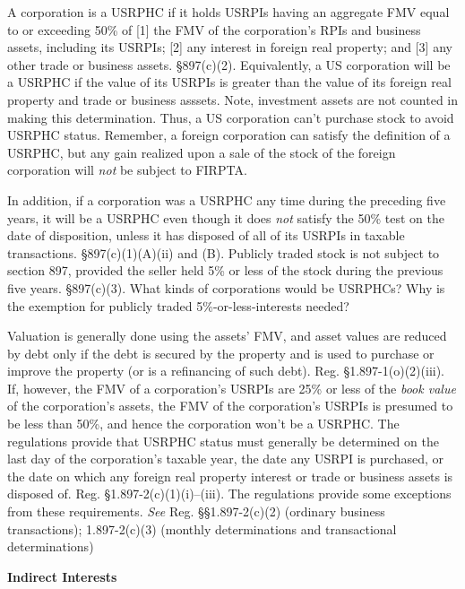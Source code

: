 A corporation is a USRPHC if it holds USRPIs having an aggregate FMV equal to or exceeding 50\% of [1] the FMV of the corporation's RPIs and business assets, including its USRPIs; [2] any interest in foreign real property; and [3] any other trade or business assets.  \S 897(c)(2).  Equivalently, a US corporation will be a USRPHC if the value of its USRPIs is greater than the value of its foreign real property and trade or business asssets.  Note, investment assets are not counted in making this determination.  Thus, a US corporation can't purchase stock to avoid USRPHC status.  Remember, a foreign corporation can satisfy the definition of a USRPHC, but any gain realized upon a sale of the stock of the foreign corporation will \emph{not} be subject to FIRPTA.  

In addition, if a corporation was a USRPHC any time during the preceding five years, it will be a USRPHC even though it does \emph{not} satisfy the 50\% test on the date of disposition, unless it has disposed of all of its USRPIs in taxable transactions.  \S 897(c)(1)(A)(ii) and (B).  Publicly traded stock is not subject to section 897, provided the seller held 5\% or less of the stock during the previous five years.  \S 897(c)(3).  What kinds of corporations would be USRPHCs?  Why is the exemption for publicly traded 5\%-or-less-interests needed?    

Valuation is generally done using the assets' FMV, and asset values are reduced by debt only if the debt is secured by the property and is used to purchase or improve the property (or is a refinancing of such debt).  Reg. \S 1.897-1(o)(2)(iii). If, however, the FMV of a corporation's USRPIs are 25\% or less of the \emph{book value} of the corporation's assets, the FMV of the corporation's USRPIs is presumed to be less than 50\%, and hence the corporation won't be a USRPHC.  The regulations provide that USRPHC status must generally be determined on the last day of the corporation's taxable year, the date any USRPI is purchased, or the date on which any foreign real property interest or trade or business assets is disposed of. Reg. \S 1.897-2(c)(1)(i)--(iii).  The regulations provide some exceptions from these requirements.  \emph{See} Reg. \S\S 1.897-2(c)(2) (ordinary business transactions); 1.897-2(c)(3) (monthly determinations and transactional determinations)

\begin{center}
\textbf{Indirect Interests}
\end{center}


